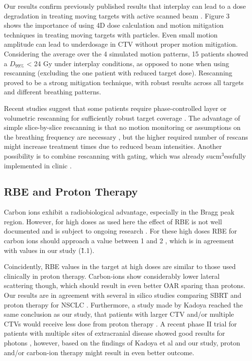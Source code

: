 Our results confirm previously published results that interplay can lead to a dose degradation in treating moving targets with active scanned beam \cite{Bert2008}. 
Figure 3 shows the importance of using 4D dose calculation and motion mitigation techniques in treating moving targets with particles. 
Even small motion amplitude can lead to underdosage in CTV without proper motion mitigation. Considering the average over the 4 simulated motion patterns, 15 patients showed a $D_{99\%}$ < 24 Gy under interplay 
conditions, as opposed to none when using rescanning (excluding the one patient with reduced target dose). Rescanning proved to be a strong mitigation technique, with robust results across all targets and different breathing patterns.

Recent studies suggest that some patients require phase-controlled layer or volumetric rescanning for sufficiently robust target coverage \cite{Mori2013,Takahashi2014}. 
The advantage of simple slice-by-slice rescanning is that no motion monitoring or assumptions on the breathing frequency are necessary \cite{Bert2011}, but the higher required number of rescans 
might increase treatment times due to reduced beam intensities. Another possibility is to combine rescanning with gating, which was already sucm$^{3}$essfully implemented in clinic \cite{Rossi2016}.




\subsection{RBE and Proton Therapy}

Carbon ions exhibit a radiobiological advantage, especially in the Bragg peak region. However, for high doses as used here the effect of RBE is not well documented and is subject to ongoing research \cite{Friedrich2014}. 
For these high doses RBE for carbon ions should approach a value between 1 and 2 \cite{Carabe2007}, which is in agreement with values in our study (\~ 1.1).

Coincidently, RBE values in the target at high doses are similar to those used clinically in proton therapy. Carbon-ions show considerably lower lateral scattering though, which should result in even better 
OAR sparing than protons. Our results are in agreement with several in silico studies comparing SBRT and proton therapy for NSCLC \cite{Roelofs2012, Kadoya2010, Register2010}. 
Furthermore, a study made by Kadoya reached the same conclusion as our study, that patients with larger CTV and/or multiple CTVs would  receive less dose from proton therapy \cite{Kadoya2010}.
A recent phase II trial for patients with multiple sites of extracranial disease showed good results for photons \cite{Iyengar2014}, however, based on the findings of Kadoya et al and our study, 
proton and/or carbon-ion therapy might result in even better outcome. 



